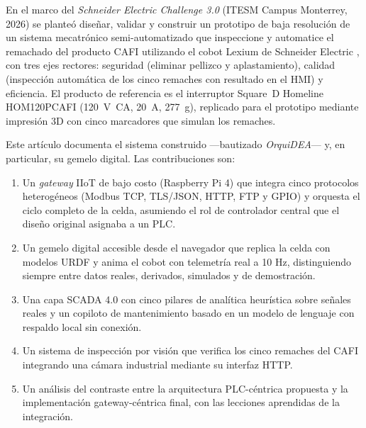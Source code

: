 \documentclass{styles/svproc}
\begin{document}
En el marco del \emph{Schneider Electric Challenge 3.0} (ITESM Campus
Monterrey, 2026) se planteó diseñar, validar y construir un prototipo de
baja resolución de un sistema mecatrónico semi-automatizado que inspeccione
y automatice el remachado del producto CAFI utilizando el cobot Lexium de
Schneider Electric \cite{lexiumcobot}, con tres ejes rectores: seguridad
(eliminar pellizco y aplastamiento), calidad (inspección automática de los
cinco remaches con resultado en el HMI) y eficiencia. El producto de
referencia es el interruptor Square~D Homeline HOM120PCAFI
\cite{hom120pcafi} (\SI{120}{\volt}~CA, \SI{20}{\ampere}, \SI{277}{\gram}),
replicado para el prototipo mediante impresión 3D con cinco marcadores que
simulan los remaches.

Este artículo documenta el sistema construido ---bautizado
\emph{OrquiDEA}--- y, en particular, su gemelo digital. Las contribuciones
son:
\begin{enumerate}
  \item Un \emph{gateway} IIoT de bajo costo (Raspberry Pi 4) que integra
        cinco protocolos heterogéneos (Modbus TCP, TLS/JSON, HTTP, FTP y
        GPIO) y orquesta el ciclo completo de la celda, asumiendo el rol de
        controlador central que el diseño original asignaba a un PLC.
  \item Un gemelo digital accesible desde el navegador que replica la celda
        con modelos URDF y anima el cobot con telemetría real a 10 Hz,
        distinguiendo siempre entre datos reales, derivados, simulados y de
        demostración.
  \item Una capa SCADA 4.0 con cinco pilares de analítica heurística
        sobre señales reales y un copiloto de mantenimiento basado en un
        modelo de lenguaje con respaldo local sin conexión.
  \item Un sistema de inspección por visión que verifica los cinco remaches
        del CAFI integrando una cámara industrial mediante su interfaz HTTP.
  \item Un análisis del contraste entre la arquitectura PLC-céntrica
        propuesta y la implementación gateway-céntrica final, con las
        lecciones aprendidas de la integración.
\end{enumerate}

\end{document}
